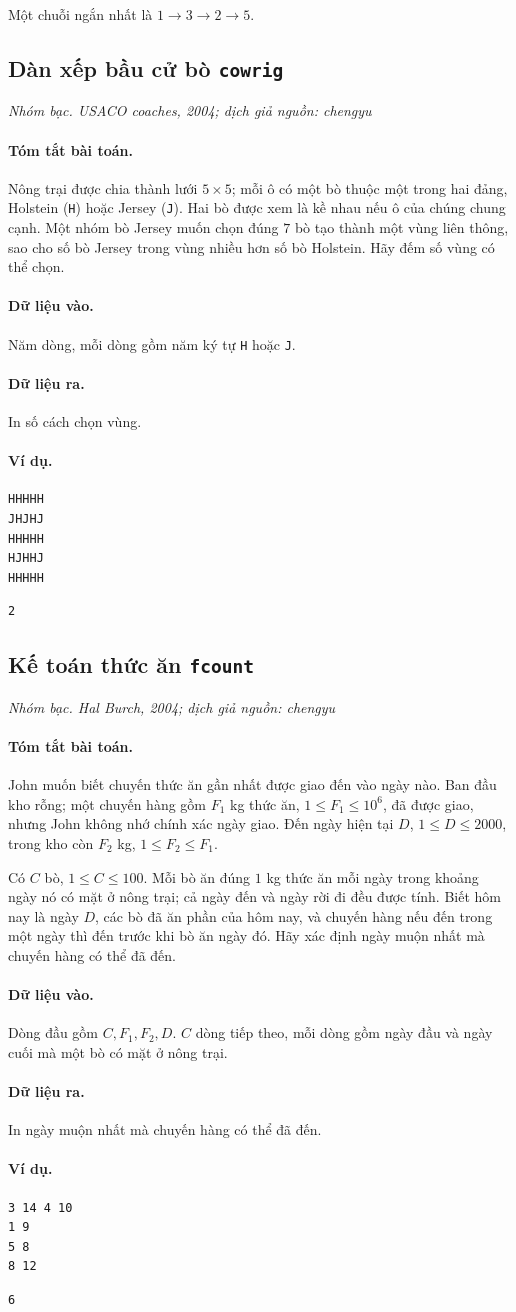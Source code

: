 \documentclass[11pt]{article}
\newcommand{\problem}[4]{%
  \subsection[#1 (#2)]{#1 \hfill {\normalsize\texttt{#2}}}%
  \noindent\textit{#3. #4}\par\smallskip
}
\newcommand{\iosec}[1]{\paragraph{#1}}
\begin{document}
Một chuỗi ngắn nhất là \(1\to3\to2\to5\).

\problem{Dàn xếp bầu cử bò}{cowrig}{Nhóm bạc}{USACO coaches, 2004; dịch giả nguồn: chengyu}

\iosec{Tóm tắt bài toán.}
Nông trại được chia thành lưới \(5\times5\); mỗi ô có một bò thuộc một trong
hai đảng, Holstein (\texttt{H}) hoặc Jersey (\texttt{J}). Hai bò được xem là
kề nhau nếu ô của chúng chung cạnh. Một nhóm bò Jersey muốn chọn đúng \(7\)
bò tạo thành một vùng liên thông, sao cho số bò Jersey trong vùng nhiều hơn
số bò Holstein. Hãy đếm số vùng có thể chọn.

\iosec{Dữ liệu vào.}
Năm dòng, mỗi dòng gồm năm ký tự \texttt{H} hoặc \texttt{J}.

\iosec{Dữ liệu ra.}
In số cách chọn vùng.

\iosec{Ví dụ.}
\begin{verbatim}
HHHHH
JHJHJ
HHHHH
HJHHJ
HHHHH
\end{verbatim}

\begin{verbatim}
2
\end{verbatim}

\problem{Kế toán thức ăn}{fcount}{Nhóm bạc}{Hal Burch, 2004; dịch giả nguồn: chengyu}

\iosec{Tóm tắt bài toán.}
John muốn biết chuyến thức ăn gần nhất được giao đến vào ngày nào. Ban đầu
kho rỗng; một chuyến hàng gồm \(F_1\) kg thức ăn,
\(1\le F_1\le 10^6\), đã được giao, nhưng John không nhớ chính xác ngày giao.
Đến ngày hiện tại \(D\), \(1\le D\le 2000\), trong kho còn \(F_2\) kg,
\(1\le F_2\le F_1\).

Có \(C\) bò, \(1\le C\le 100\). Mỗi bò ăn đúng \(1\) kg thức ăn mỗi ngày trong
khoảng ngày nó có mặt ở nông trại; cả ngày đến và ngày rời đi đều được tính.
Biết hôm nay là ngày \(D\), các bò đã ăn phần của hôm nay, và chuyến hàng nếu
đến trong một ngày thì đến trước khi bò ăn ngày đó. Hãy xác định ngày muộn
nhất mà chuyến hàng có thể đã đến.

\iosec{Dữ liệu vào.}
Dòng đầu gồm \(C,F_1,F_2,D\). \(C\) dòng tiếp theo, mỗi dòng gồm ngày đầu và
ngày cuối mà một bò có mặt ở nông trại.

\iosec{Dữ liệu ra.}
In ngày muộn nhất mà chuyến hàng có thể đã đến.

\iosec{Ví dụ.}
\begin{verbatim}
3 14 4 10
1 9
5 8
8 12
\end{verbatim}

\begin{verbatim}
6
\end{verbatim}
\end{document}
